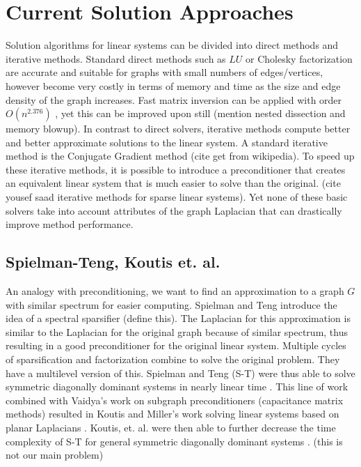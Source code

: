 \documentclass{article}
\begin{document}
\section{Current Solution Approaches}
Solution algorithms for linear systems can be divided into direct methods and iterative methods. Standard direct methods such as $LU$ or Cholesky factorization are accurate and suitable for graphs with small numbers of edges/vertices, however become very costly in terms of memory and time as the size and edge density of the graph increases. Fast matrix inversion can be applied with order $O(n^{2.376})$ \cite{Spielman:2010}, yet this can be improved upon still (mention nested dissection and memory blowup). In contrast to direct solvers, iterative methods compute better and better approximate solutions to the linear system. A standard iterative method is the Conjugate Gradient method (cite get from wikipedia). To speed up these iterative methods, it is possible to introduce a preconditioner that creates an equivalent linear system that is much easier to solve than the original. (cite yousef saad iterative methods for sparse linear systems). Yet none of these basic solvers take into account attributes of the graph Laplacian that can drastically improve method performance.

\subsection{Spielman-Teng, Koutis et. al.}
An analogy with preconditioning, we want to find an approximation to a graph $G$ with similar spectrum for easier computing. Spielman and Teng introduce the idea of a spectral sparsifier (define this). The Laplacian for this approximation is similar to the Laplacian for the original graph because of similar spectrum, thus resulting in a good preconditioner for the original linear system. Multiple cycles of sparsification and factorization combine to solve the original problem. They have a multilevel version of this. Spielman and Teng (S-T) were thus able to solve symmetric diagonally dominant systems in nearly linear time \cite{Spielman:2008}.  This line of work combined with Vaidya's \cite{Vaidya:1991} work on subgraph preconditioners (capacitance matrix methods) resulted in Koutis and Miller's work solving linear systems based on planar Laplacians \cite{Koutis:2007}. Koutis, et. al. were then able to further decrease the time complexity of S-T for general symmetric diagonally dominant systems \cite{Koutis:2010}. (this is not our main problem)
\end{document}
